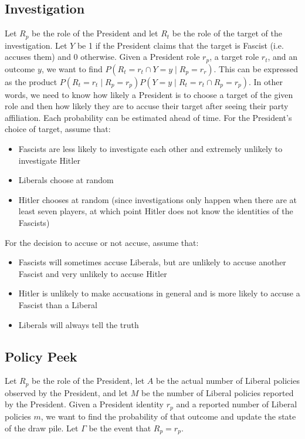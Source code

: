 \documentclass[fleqn, 12pt, letterpaper]{article}
\begin{document}
\subsection{Investigation}
Let $R_p$ be the role of the President and let $R_t$ be the role of the target of the investigation. Let $Y$ be 1 if the President claims that the target is Fascist (i.e. accuses them) and 0 otherwise. Given a President role $r_p$, a target role $r_t$, and an outcome $y$, we want to find $P(R_t=r_t \cap Y=y \mid R_p=r_r)$. This can be expressed as the product $P(R_t=r_t \mid R_p=r_p) P(Y=y \mid R_t=r_t \cap R_p=r_p)$. In other words, we need to know how likely a President is to choose a target of the given role and then how likely they are to accuse their target after seeing their party affiliation. Each probability can be estimated ahead of time. For the President's choice of target, assume that:
\begin{itemize}
	\item Fascists are less likely to investigate each other and extremely unlikely to investigate Hitler
	\item Liberals choose at random
	\item Hitler chooses at random (since investigations only happen when there are at least seven players, at which point Hitler does not know the identities of the Fascists)
\end{itemize}
For the decision to accuse or not accuse, assume that:
\begin{itemize}
	\item Fascists will sometimes accuse Liberals, but are unlikely to accuse another Fascist and very unlikely to accuse Hitler
	\item Hitler is unlikely to make accusations in general and is more likely to accuse a Fascist than a Liberal
	\item Liberals will always tell the truth
\end{itemize}

\newpage
\subsection{Policy Peek}
Let $R_p$ be the role of the President, let $A$ be the actual number of Liberal policies observed by the President, and let $M$ be the number of Liberal policies reported by the President. Given a President identity $r_p$ and a reported number of Liberal policies $m$, we want to find the probability of that outcome and update the state of the draw pile. Let $\Gamma$ be the event that $R_p=r_p$.
\end{document}
